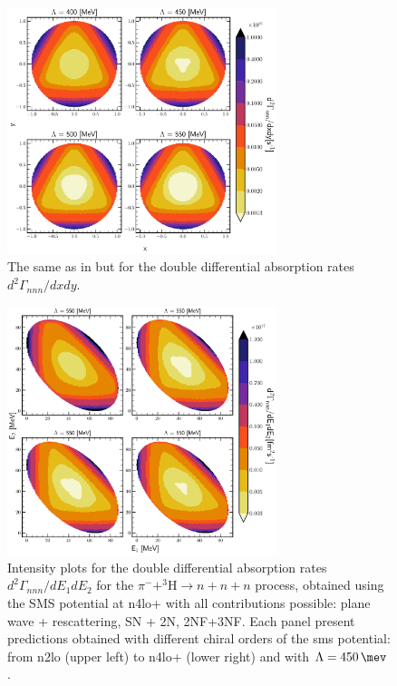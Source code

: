     \begin{figure}[h]
        \begin{center}
        \includegraphics[width=0.7\textwidth]{PlotData/PION/Dalitz_maps/figures/Dalitz_map_nnn_xy_cutofs.pdf}
        \end{center}
        \caption{The same as in  but for the double differential absorption rates
        $d^2 \Gamma_{nnn}/dxdy$.}
        \label{pion_nnn_xy_cutoff}
    \end{figure}


    \begin{figure}[h]
        \begin{center}
        \includegraphics[width=0.7\textwidth]{PlotData/PION/Dalitz_maps/figures/Dalitz_map_nnn_E1E2_orders.pdf}
        \end{center}
        \caption{Intensity plots for the double differential absorption rates
        $d^2 \Gamma_{nnn}/dE_1dE_2$ for the $\pi^- + ^3\text{H} \rightarrow n + n + n$
        process, obtained using the SMS potential at \gls{n4lo+}
        with all contributions possible: plane wave + rescattering, SN + 2N, 2NF+3NF.
        Each panel present predictions obtained with different chiral orders of the \gls{sms} potential:
        from \gls{n2lo} (upper left) to \gls{n4lo+} (lower right) and with $\Lambda = \SI{450}{\mev}$.}
        \label{pion_nnn_E1E2_order}
    \end{figure}


